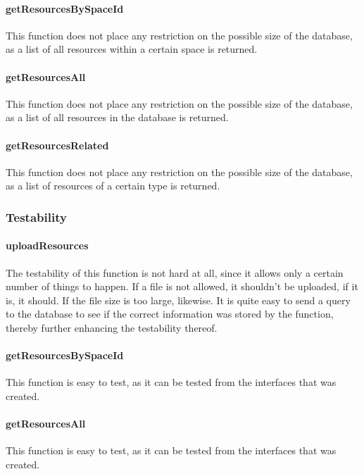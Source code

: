 \documentclass[a4paper]{article}
\begin{document}
\paragraph{getResourcesBySpaceId}
This function does not place any restriction on the possible size of the database, as a list of all resources within a certain space is returned.

\paragraph{getResourcesAll}
This function does not place any restriction on the possible size of the database, as a list of all resources in the database is returned.

\paragraph{getResourcesRelated}
This function does not place any restriction on the possible size of the database, as a list of resources of a certain type is returned.

\subsubsection {Testability}

\paragraph{uploadResources}
The testability of this function is not hard at all, since it allows only a certain number of things to happen. If a file is not allowed, it shouldn't be uploaded, if it is, it should. If the file size is too large, likewise. It is quite easy to send a query to the database to see if the correct information was stored by the function, thereby further enhancing the testability thereof.

\paragraph{getResourcesBySpaceId}
This function is easy to test, as it can be tested from the interfaces that was created.

\paragraph{getResourcesAll}
This function is easy to test, as it can be tested from the interfaces that was created.
\end{document}
